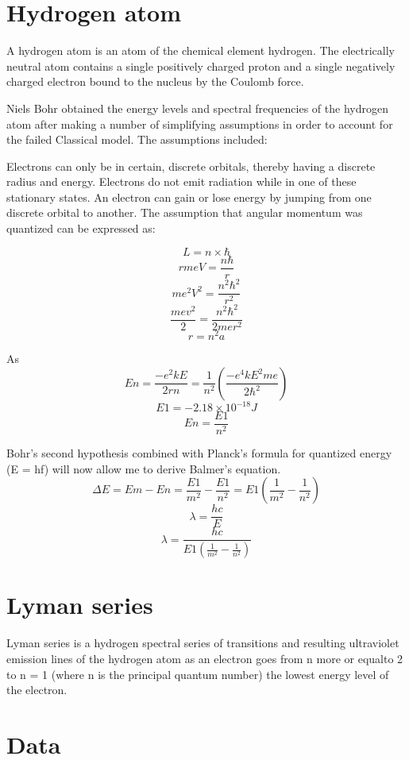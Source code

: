 \documentclass{article}
\begin{document}
\section{Hydrogen atom}
A hydrogen atom is an atom of the chemical element hydrogen. The electrically neutral atom contains a single positively charged proton and a single negatively charged electron bound to the nucleus by the Coulomb force. 


Niels Bohr obtained the energy levels and spectral frequencies of the hydrogen atom after making a number of simplifying assumptions in order to account for the failed Classical model. The assumptions included:

Electrons can only be in certain, discrete orbitals, thereby having a discrete radius and energy.
Electrons do not emit radiation while in one of these stationary states.
An electron can gain or lose energy by jumping from one discrete orbital to another.
The assumption that angular momentum was quantized can be expressed as:

$$L=n\times \hbar$$
$$rmeV=\frac{n\hbar}{r}$$
$$me^2V^2=\frac{n^2\hbar^2}{r^2}$$
$$\frac{mev^2}{2}=\frac{n^2\hbar^2}{2mer^2}$$
$$r=n^2a$$

As $$En=\frac{-e^2kE}{2rn}=\frac{1}{n^2}(\frac{-e^4kE^2me}{2\hbar^2})$$
   $$E1=-2.18 \times10^{-18} J$$
   $$En=\frac{E1}{n^2}$$


Bohr's second hypothesis combined with Planck's formula for quantized energy (E = hf) will now allow me to derive Balmer's equation.
$$ \Delta E=Em-En=\frac{E1}{m^2}-\frac{E1}{n^2}=E1(\frac{1}{m^2}-\frac{1}{n^2})$$
$$ \lambda=\frac{hc}{E}$$
$$ \lambda=\frac{hc}{E1(\frac{1}{m^2}-\frac{1}{n^2})}$$

\section{Lyman series}

 Lyman series is a hydrogen spectral series of transitions and resulting ultraviolet emission lines of the hydrogen atom as an electron goes from n more or equalto 2 to n = 1 (where n is the principal quantum number) the lowest energy level of the electron.
\section{Data}
\begin{table}[htbp]
\begin{center}
\footnotesize
{}
\end{center}
  \caption{Lyman series}
  \label{tab:font-sizes}
\end{table}
\end{document}
